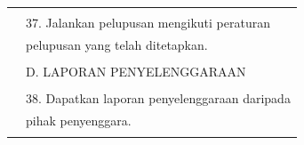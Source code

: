 \documentclass[
]{article}
\begin{document}
\begin{longtable}[]{@{}ll@{}}
\begin{minipage}[t]{0.71\columnwidth}
\strut
\end{minipage}\tabularnewline
\begin{minipage}[t]{0.23\columnwidth}\raggedright
\strut
\end{minipage} & \begin{minipage}[t]{0.71\columnwidth}\raggedright
37. Jalankan pelupusan mengikuti peraturan\strut
\end{minipage}\tabularnewline
\begin{minipage}[t]{0.23\columnwidth}\raggedright
\strut
\end{minipage} & \begin{minipage}[t]{0.71\columnwidth}\raggedright
pelupusan yang telah ditetapkan.\strut
\end{minipage}\tabularnewline
\begin{minipage}[t]{0.23\columnwidth}\raggedright
\strut
\end{minipage} & \begin{minipage}[t]{0.71\columnwidth}\raggedright
\strut
\end{minipage}\tabularnewline
\begin{minipage}[t]{0.23\columnwidth}\raggedright
\strut
\end{minipage} & \begin{minipage}[t]{0.71\columnwidth}\raggedright
D. LAPORAN PENYELENGGARAAN\strut
\end{minipage}\tabularnewline
\begin{minipage}[t]{0.23\columnwidth}\raggedright
\strut
\end{minipage} & \begin{minipage}[t]{0.71\columnwidth}\raggedright
\strut
\end{minipage}\tabularnewline
\begin{minipage}[t]{0.23\columnwidth}\raggedright
\strut
\end{minipage} & \begin{minipage}[t]{0.71\columnwidth}\raggedright
38. Dapatkan laporan penyelenggaraan daripada\strut
\end{minipage}\tabularnewline
\begin{minipage}[t]{0.23\columnwidth}\raggedright
\strut
\end{minipage} & \begin{minipage}[t]{0.71\columnwidth}\raggedright
pihak penyenggara.\strut
\end{minipage}\tabularnewline
\begin{minipage}[t]{0.23\columnwidth}\raggedright
\strut
\end{minipage} & \begin{minipage}[t]{0.71\columnwidth}\raggedright

\end{minipage}
\end{longtable}
\end{document}

